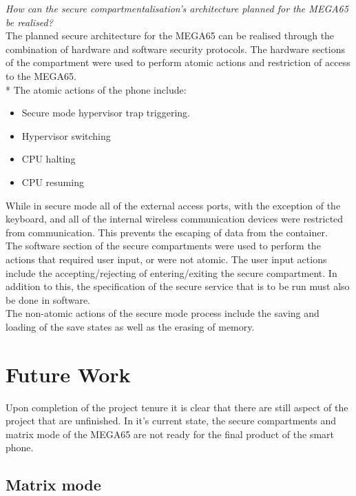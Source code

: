 \textit{How can the secure compartmentalisation's architecture planned for the MEGA65 be realised?}\\
The planned secure architecture for the MEGA65 can be realised through the combination of hardware and software security protocols. The hardware sections of the compartment were used to perform atomic actions and restriction of access to the MEGA65.\\*
The atomic actions of the phone include:
\begin{itemize}
\item{Secure mode hypervisor trap triggering.}
\item{Hypervisor switching}
\item{CPU halting}
\item{CPU resuming}
\end{itemize}
While in secure mode all of the external access ports, with the exception of the keyboard, and all of the internal wireless communication devices were restricted from communication. This prevents the escaping of data from the container.\\

The software section of the secure compartments were used to perform the actions that required user input, or were not atomic. The user input actions include the accepting/rejecting of entering/exiting the secure compartment. In addition to this, the specification of the secure service that is to be run must also be done in software.\\
The non-atomic actions of the secure mode process include the saving and loading of the save states as well as the erasing of memory.
\\


\section{Future Work}

\label{Ch7 Sec4}

Upon completion of the project tenure it is clear that there are still aspect of the project that are unfinished. In it's current state, the secure compartments and matrix mode of the MEGA65 are not ready for the final product of the smart phone.

\subsection{Matrix mode}

